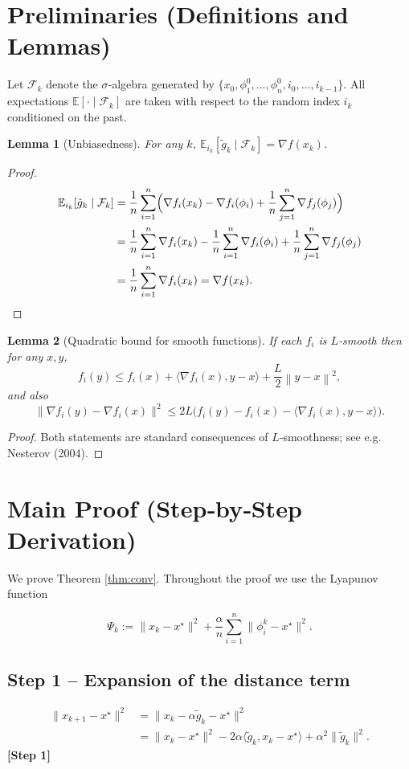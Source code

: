 \documentclass{article}
\newtheorem{lemma}{Lemma}
\newcommand{\E}{\mathbb{E}}
\newcommand{\norm}[1]{\left\lVert #1\right\rVert}
\begin{document}
\newpage
\section*{Preliminaries (Definitions and Lemmas)}
\begin{definition}[Filtration]
Let $\mathcal F_k$ denote the $\sigma$‑algebra generated by $\{x_0,\phi_1^{0},\dots,\phi_n^{0},i_0,\dots,i_{k-1}\}$. All expectations $\E[\cdot\mid\mathcal F_k]$ are taken with respect to the random index $i_k$ conditioned on the past.
\end{definition}
\begin{lemma}[Unbiasedness]\label{lem:unbiased}
For any $k$, $\E_{i_k}[\tilde g_k\mid\mathcal F_k]=\nabla f(x_k)$.
\end{lemma}
\begin{proof}
\begin{align*}
\E_{i_k}[\tilde g_k\mid\mathcal F_k]
&=\frac1n\sum_{i=1}^{n}\Bigl(\nabla f_i(x_k)-\nabla f_i(\phi_i)+\frac1n\sum_{j=1}^{n}\nabla f_j(\phi_j)\Bigr)\\
&=\frac1n\sum_{i=1}^{n}\nabla f_i(x_k)-\frac1n\sum_{i=1}^{n}\nabla f_i(\phi_i)+\frac1n\sum_{j=1}^{n}\nabla f_j(\phi_j)\\
&=\frac1n\sum_{i=1}^{n}\nabla f_i(x_k)=\nabla f(x_k).
\end{align*}
\end{proof}
\begin{lemma}[Quadratic bound for smooth functions]\label{lem:smooth}
If each $f_i$ is $L$‑smooth then for any $x,y$,
\[
f_i(y)\le f_i(x)+\langle\nabla f_i(x),y-x\rangle+\frac{L}{2}\norm{y-x}^2,
\tag{11}
\]
and also
\[
\|\nabla f_i(y)-\nabla f_i(x)\|^2\le 2L\bigl(f_i(y)-f_i(x)-\langle\nabla f_i(x),y-x\rangle\bigr).
\tag{12}
\]
\end{lemma}
\begin{proof}
Both statements are standard consequences of $L$‑smoothness; see e.g. Nesterov (2004). \qedhere
\end{proof}

\section*{Main Proof (Step‑by‑Step Derivation)}
We prove Theorem \ref{thm:conv}. Throughout the proof we use the Lyapunov function  

\[
\Psi_k:=\|x_k-x^\star\|^2+\frac{\alpha}{n}\sum_{i=1}^{n}\|\phi_i^{k}-x^\star\|^2.
\tag{13}
\]

\subsection*{Step 1 – Expansion of the distance term}
\begin{align}
\|x_{k+1}-x^\star\|^2
&=\|x_k-\alpha\tilde g_k-x^\star\|^2 \nonumber\\
&=\|x_k-x^\star\|^2-2\alpha\langle\tilde g_k,x_k-x^\star\rangle+\alpha^2\|\tilde g_k\|^2.
\tag{14}
\end{align}
\noindent\textbf{[Step 1]}
\end{document}

